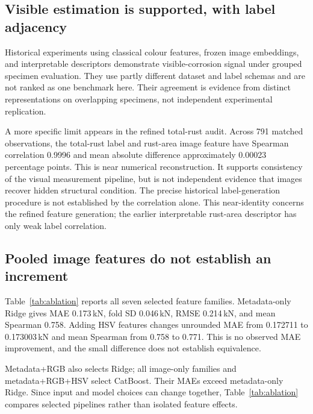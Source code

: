 \documentclass[conference]{IEEEtran}
\newcommand{\shared}{../..}
\begin{document}
\subsection{Visible estimation is supported, with label adjacency}
Historical experiments using classical colour features, frozen image embeddings, and interpretable descriptors demonstrate visible-corrosion signal under grouped specimen evaluation. They use partly different dataset and label schemas and are not ranked as one benchmark here. Their agreement is evidence from distinct representations on overlapping specimens, not independent experimental replication.

A more specific limit appears in the refined total-rust audit. Across 791 matched observations, the total-rust label and rust-area image feature have Spearman correlation 0.9996 and mean absolute difference approximately 0.00023 percentage points. This is near numerical reconstruction. It supports consistency of the visual measurement pipeline, but is not independent evidence that images recover hidden structural condition. The precise historical label-generation procedure is not established by the correlation alone. This near-identity concerns the refined feature generation; the earlier interpretable rust-area descriptor has only weak label correlation.

\subsection{Pooled image features do not establish an increment}
Table~\ref{tab:ablation} reports all seven selected feature families. Metadata-only Ridge gives MAE 0.173\,kN, fold SD 0.046\,kN, RMSE 0.214\,kN, and mean Spearman 0.758. Adding HSV features changes unrounded MAE from 0.172711 to 0.173003\,kN and mean Spearman from 0.758 to 0.771. This is no observed MAE improvement, and the small difference does not establish equivalence.
\begin{table}[t]\centering
\caption{Pooled terminal-load results: 48 specimens, ten grouped folds. MAE and sample fold SD are in kN; $R^2$ and $\rho$ are mean fold metrics. The same folds select and score the displayed configurations.}\label{tab:ablation}
\footnotesize
\end{table}

Metadata+RGB also selects Ridge; all image-only families and metadata+RGB+HSV select CatBoost. Their MAEs exceed metadata-only Ridge. Since input and model choices can change together, Table~\ref{tab:ablation} compares selected pipelines rather than isolated feature effects.
\end{document}

